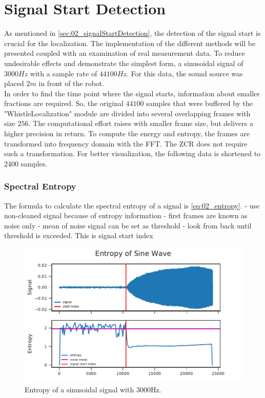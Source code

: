 \section{Signal Start Detection}
\label{sec:03_signalStartDetection}

As mentioned in \ref{sec:02_signalStartDetection}, the detection of the
signal start is crucial for the localization.
The implementation of the different methods will be presented coupled with
an examination of real measurement data.
To reduce undesirable effects and demonstrate the simplest form, a sinusoidal
signal of $3000\si{Hz}$ with a sample rate of $44100\si{Hz}$. For this
data, the sound source was placed $2\si{m}$ in front of the robot.\\
In order to find the time point where the signal starts, information about
smaller fractions are required.
So, the original $44100$ samples that were buffered by the
"WhistleLocalization" module are divided into several overlapping
frames with size $256$. The computational effort raises with smaller frame size,
but delivers a higher precision in return.
To compute the energy and entropy, the frames are transformed into
frequency domain with the \ac{FFT}.
The \ac{ZCR} does not require such a transformation.
For better visualization, the following data is shortened to $2400$ samples.


\subsubsection*{Spectral Entropy}

The formula to calculate the spectral entropy of a signal is \ref{eq:02_entropy}.
- use non-cleaned signal because of entropy information
- first frames are known as noise only
- mean of noise signal can be set as threshold
- look from back until threshold is exceeded. This is signal start index


\begin{figure}[ht]
	\centering
		\includegraphics[]{figures/sine_entropy}
	\caption{Entropy of a sinusoidal signal with 3000Hz.}
\end{figure}
\label{fig:03_entropy}

